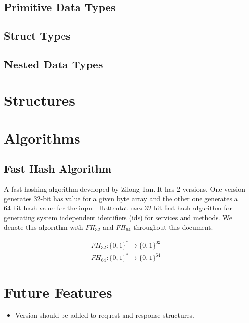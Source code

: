 \documentclass[10pt,a4paper]{article}
\begin{document}
\subsection{Primitive Data Types}
\subsection{Struct Types}
\subsection{Nested Data Types}

\section{Structures}

\section{Algorithms}

\subsection{Fast Hash Algorithm}
A fast hashing algorithm developed by Zilong Tan. It has 2 versions. One version generates 32-bit has value for a given byte array and the other one generates a 64-bit hash value for the input. Hottentot uses 32-bit fast hash algorithm for generating system independent identifiers (ids) for services and methods. We denote this algorithm with $ FH_{32} $ and $ FH_{64} $ throughout this document.

\begin{equation}
\begin{split}
  FH_{32}: \{0, 1\}^* \to \{0, 1\}^{32}  \\
  FH_{64}: \{0, 1\}^* \to \{0, 1\}^{64}
\end{split}
\end{equation}


\section{Future Features}
\begin{itemize}
  \item Version should be added to request and response structures.
\end{itemize}
\end{document}
